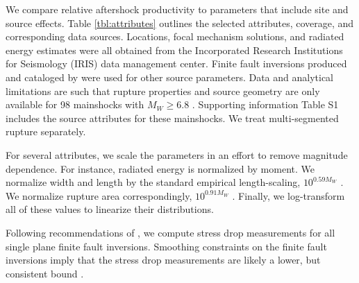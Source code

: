 \documentclass[draft, jgrga]{agujournal2018}
\begin{document}

We compare relative aftershock productivity to parameters that include site and source effects. Table \ref{tbl:attributes} outlines the selected attributes, coverage, and corresponding data sources. Locations, focal mechanism solutions, and radiated energy estimates were all obtained from the Incorporated Research Institutions for Seismology (IRIS) data management center. Finite fault inversions produced and cataloged by \citet{Hayes2017} were used for other source parameters. Data and analytical limitations are such that rupture properties and source geometry are only available for 98 mainshocks with $M_W\ge6.8$ \citep{Hayes2017}. Supporting information Table S1 includes the source attributes for these mainshocks. We treat multi-segmented rupture separately.

For several attributes, we scale the parameters in an effort to remove magnitude dependence. For instance, radiated energy is normalized by moment. We normalize width and length by the standard empirical length-scaling, $10^{0.59M_W}$ \citep[][Table 2A - Subsurface rupture dimensions]{Wells1994}. We normalize rupture area correspondingly, $10^{0.91M_W}$ \citep[][Table 2A - Rupture area]{Wells1994}. Finally, we log-transform all of these values to linearize their distributions.

Following recommendations of \citet{Noda2013}, we compute stress drop measurements for all single plane finite fault inversions. Smoothing constraints on the finite fault inversions imply that the stress drop measurements are likely a lower, but consistent bound \citep{Adams2017ExploringInversions}.
\end{document}
